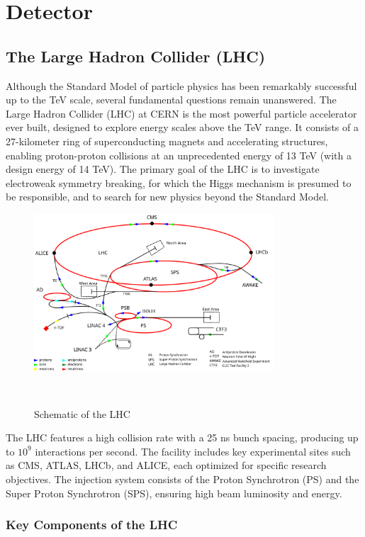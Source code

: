 \chapter{Detector}

\section{The Large Hadron Collider (LHC)}
Although the Standard Model of particle physics has been remarkably successful up to the TeV scale, several fundamental questions remain unanswered. The Large Hadron Collider (LHC) at CERN is the most powerful particle accelerator ever built, designed to explore energy scales above the TeV range. It consists of a 27-kilometer ring of superconducting magnets and accelerating structures, enabling proton-proton collisions at an unprecedented energy of 13 TeV (with a design energy of 14 TeV). The primary goal of the LHC is to investigate electroweak symmetry breaking, for which the Higgs mechanism is presumed to be responsible, and to search for new physics beyond the Standard Model.

\begin{figure}[ht]
\centering
\includegraphics[width=0.8\textwidth]{Figures/Cern_Accelerator_Complex.png} %
\caption{Schematic of the LHC}~\cite{lhc_picture}
\label{fig:lhc}
\end{figure}

The LHC features a high collision rate with a 25 ns bunch spacing, producing up to $10^9$ interactions per second. The facility includes key experimental sites such as CMS, ATLAS, LHCb, and ALICE, each optimized for specific research objectives. The injection system consists of the Proton Synchrotron (PS) and the Super Proton Synchrotron (SPS), ensuring high beam luminosity and energy.

\subsection{Key Components of the LHC}

